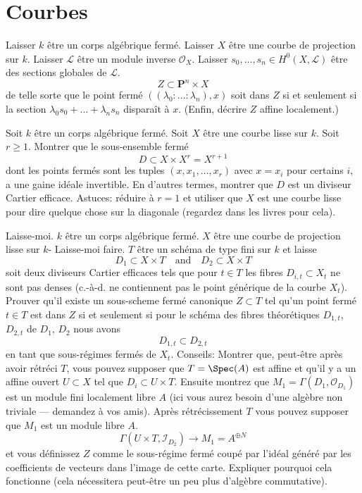 \section{Courbes}
\label{section-curves}

\begin{exercise}
\label{exercise-closed-subset-vanshing}
Laisser $k$ être un corps algébrique fermé. Laisser $X$ être
une courbe de projection sur $k$. Laisser $\mathcal{L}$ être
un module inverse $\mathcal{O}_X$. Laisser $s_0,
\ldots, s_n \in H^0(X, \mathcal{L})$
être des sections globales de $\mathcal{L}$.
$$
Z \subset
\mathbf{P}^n \times X
$$
de telle sorte que le
point fermé $((\lambda_0 : \ldots : \lambda_n),
x)$ soit dans $Z$ si et seulement
si la section $\lambda_0 s_0 + \ldots +
\lambda_n s_n$ disparaît à $x$. (Enfin, décrire $Z$ affine localement.)
\end{exercise}

\begin{exercise}
\label{exercise-diagonal-cartier}
Soit $k$ être un corps algébrique fermé. Soit $X$ être une courbe lisse sur $k$.
Soit $r \geq 1$. Montrer que le sous-ensemble fermé
$$
D \subset X \times X^r = X^{r + 1}
$$
dont les points fermés sont les tuples $(x, x_1, \ldots, x_r)$ avec $x
= x_i$ pour certains $i$, a une gaine idéale invertible. En d'autres termes, montrer
que $D$
est un diviseur Cartier efficace. Astuces: réduire à $r = 1$ et utiliser
que $X$ est une courbe lisse pour dire quelque chose sur la diagonale (regardez
dans les livres pour cela).
\end{exercise}

\begin{exercise}
\label{exercise-one-divisor-in-another}
Laisse-moi. $k$ être un corps algébrique fermé. $X$ être une courbe de projection lisse sur $k$-
Laisse-moi faire. $T$ être un schéma de type fini sur $k$ et laisse
$$
D_1 \subset X \times T
\quad\text{and}\quad
D_2 \subset X \times T
$$
soit deux diviseurs Cartier efficaces tels que pour $t \in T$ les
fibres $D_{i, t} \subset X_t$ ne sont pas denses (c.-à-d. ne contiennent pas
le point générique de la courbe $X_t$).
Prouver qu'il existe un sous-scheme fermé canonique $Z \subset T$
tel qu'un point fermé $t \in T$ est dans $Z$ si
et seulement si pour le schéma des fibres théorétiques $D_{1, t}$, $D_{2, t}$
de $D_1$, $D_2$ nous avons
$$
D_{1, t} \subset D_{2, t}
$$
en tant que sous-régimes fermés de
$X_t$. Conseils: Montrer que, peut-être après avoir rétréci $T$, vous
pouvez supposer que $T = \Spec(A)$ est affine et qu'il y a un affine
ouvert $U \subset X$ tel que $D_i \subset U \times
T$. Ensuite montrez que $M_1 = \Gamma(D_1, \mathcal{O}_{D_1})$ est un module fini localement libre
$A$ (ici vous aurez besoin d'une algèbre non triviale --- demandez à vos
amis). Après rétrécissement $T$ vous pouvez supposer que $M_1$ est un module
libre $A$.
$$
\Gamma(U \times T, \mathcal{I}_{D_2}) \to M_1 = A^{\oplus N}
$$
et vous définissez $Z$ comme le sous-régime fermé coupé par l'idéal généré
par les coefficients de vecteurs dans l'image de cette carte. Expliquer pourquoi
cela fonctionne (cela nécessitera peut-être un peu plus d'algèbre commutative).
\end{exercise}

